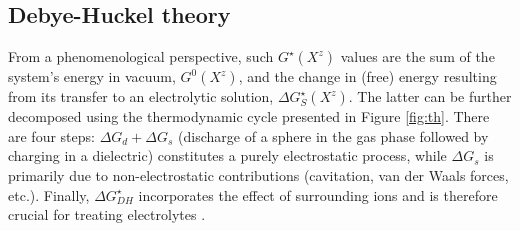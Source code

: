 \documentclass[review,preprint]{elsarticle}
\begin{document}
\subsection{Debye-Huckel theory}

From a phenomenological perspective, such $G^\star(X^z)$ values are the sum of the system's energy in vacuum, $G^0(X^z)$, and the change in (free) energy resulting from its transfer to an electrolytic solution, $\Delta G_S^\star(X^z)$. The latter can be further decomposed using the thermodynamic cycle presented in Figure \ref{fig:th}. There are four steps: $\Delta G_d + \Delta G_s$ (discharge of a sphere in the gas phase followed by charging in a dielectric) constitutes a purely electrostatic process, while $\Delta G_s$ is primarily due to non-electrostatic contributions (cavitation, van der Waals forces, etc.). Finally, $\Delta G^\star_{DH}$ incorporates the effect of surrounding ions and is therefore crucial for treating electrolytes \cite{silvaImprovingBornEquation2024}.
\end{document}
